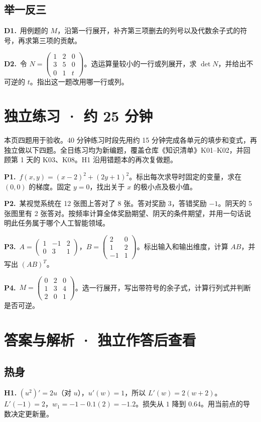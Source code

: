 \documentclass[UTF8,a4paper,11pt]{ctexart}
\newcommand{\PracticeQuestion}[3]{\par\Needspace{4\baselineskip}\noindent\begin{minipage}{\linewidth}\textbf{#1.}\ #2\par\noindent\rule{0pt}{#3mm}\par\end{minipage}\par}
\begin{document}
\subsection{举一反三}
\PracticeQuestion{D1}{用例题的 $M$，沿第一行展开，补齐第三项删去的列号以及代数余子式的符号，再求第三项的贡献。}{32}
\PracticeQuestion{D2}{令 $N=\begin{pmatrix}1&2&0\\3&5&0\\0&1&t\end{pmatrix}$。选运算量较小的一行或列展开，求 $\det N$，并给出不可逆的 $t$。指出这一题改用哪一行或列。}{32}
\clearpage
\section{独立练习 · 约 25 分钟}
本页四题用于验收。40 分钟练习时段先用约 15 分钟完成各单元的填步和变式，再独立做以下四题。全日练习均为新编题，覆盖仓库《知识清单》K01–K02，并回顾第 1 天的 K03、K08。H1 沿用错题本的再次复做题。

\PracticeQuestion{P1}{$f(x,y)=(x-2)^2+(2y+1)^2$。标出每次求导时固定的变量，求在 $(0,0)$ 的梯度。固定 $y=0$，找出关于 $x$ 的极小点及极小值。}{35}
\PracticeQuestion{P2}{某视觉系统在 12 张图上答对了 8 张。答对奖励 3，答错奖励 $-1$。阴天的 5 张图里有 2 张答对。按频率计算全体奖励期望、阴天的条件期望，并用一句话说明此任务属于哪个人工智能领域。}{35}
\PracticeQuestion{P3}{$A=\begin{pmatrix}1&-1&2\\0&3&1\end{pmatrix}$，$B=\begin{pmatrix}2&0\\1&2\\-1&1\end{pmatrix}$。标出输入和输出维度，计算 $AB$，并写出 $(AB)^T$。}{35}
\PracticeQuestion{P4}{$M=\begin{pmatrix}0&2&0\\1&3&4\\2&0&1\end{pmatrix}$。选一行展开，写出带符号的余子式，计算行列式并判断是否可逆。}{35}
\clearpage
\section{答案与解析 · 独立作答后查看}
\subsection{热身}
\textbf{H1.} $(u^2)'=2u$（对 $u$），$u'(w)=1$，所以 $L'(w)=2(w+2)$。$L'(-1)=2$，$w_1=-1-0.1(2)=-1.2$。损失从 $1$ 降到 $0.64$。用当前点的导数决定更新量。
\end{document}
